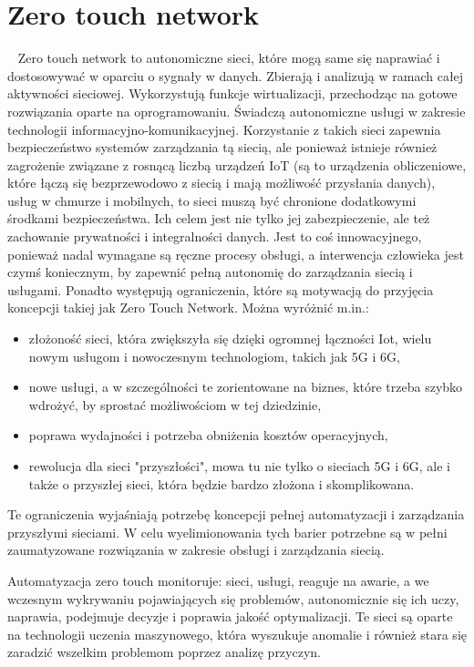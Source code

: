 \documentclass[sn-mathphys,Numbered]{sn-jnl}
\theoremstyle{thmstyleone}%
\theoremstyle{thmstyletwo}%
\theoremstyle{thmstylethree}%
\begin{document}
\section{Zero touch network}

~   Zero touch network to autonomiczne sieci, które mogą same się naprawiać i dostosowywać w oparciu o sygnały w danych. Zbierają i analizują w ramach całej aktywności sieciowej. Wykorzystują funkcje wirtualizacji, przechodząc na gotowe rozwiązania oparte na oprogramowaniu. Świadczą autonomiczne usługi w zakresie technologii informacyjno-komunikacyjnej. Korzystanie z takich sieci zapewnia bezpieczeństwo systemów zarządzania tą siecią, ale ponieważ istnieje również zagrożenie związane z rosnącą liczbą urządzeń IoT (są to urządzenia obliczeniowe, które łączą się bezprzewodowo z siecią i mają możliwość przysłania danych), usług w chmurze i mobilnych, to sieci muszą być chronione dodatkowymi środkami bezpieczeństwa. Ich celem jest nie tylko jej zabezpieczenie, ale też zachowanie prywatności i integralności danych\cite{noauthor_zero_nodate-1}.
Jest to coś innowacyjnego, ponieważ nadal wymagane są ręczne procesy obsługi, a interwencja człowieka jest czymś koniecznym, by zapewnić pełną autonomię do zarządzania siecią i usługami. Ponadto występują ograniczenia, które są motywacją do przyjęcia koncepcji takiej jak Zero Touch Network. Można wyróżnić m.in.:
\begin{itemize}
\item złożoność sieci, która zwiększyła się dzięki ogromnej łączności Iot, wielu nowym usługom i nowoczesnym technologiom, takich jak 5G i 6G,
\item nowe usługi, a w szczególności te zorientowane na biznes, które trzeba szybko wdrożyć, by sprostać możliwościom w tej dziedzinie,
\item poprawa wydajności i potrzeba obniżenia kosztów operacyjnych, 
\item rewolucja dla sieci "przyszłości", mowa tu nie tylko o sieciach 5G i 6G, ale i także o przyszłej sieci, która będzie bardzo złożona i skomplikowana.
\end{itemize}
Te ograniczenia wyjaśniają potrzebę koncepcji pełnej automatyzacji i zarządzania przyszłymi sieciami. W celu wyelimionowania tych barier potrzebne są w pełni zaumatyzowane rozwiązania w zakresie obsługi i zarządzania siecią\cite{liyanage_survey_2022}.

Automatyzacja zero touch monitoruje: sieci, usługi, reaguje na awarie, a we wczesnym wykrywaniu pojawiających się problemów, autonomicznie się ich uczy, naprawia, podejmuje decyzje i poprawia jakość optymalizacji. Te sieci są oparte na technologii uczenia maszynowego, która wyszukuje anomalie i również stara się zaradzić wszelkim problemom poprzez analizę przyczyn\cite{noauthor_what_nodate-1}.
\end{document}
